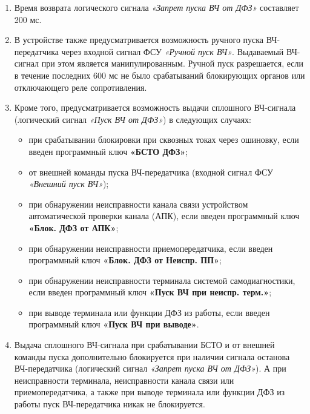 \begin{enumerate}[label=\arabic{section}.\arabic{subsection}.\arabic{enumi}, labelsep=4pt, leftmargin=0pt, itemindent=57pt, itemsep=0pt, parsep=5pt]
\begin{enumerate}[label=\arabic{section}.\arabic{subsection}.\arabic{enumi}.\arabic*, labelsep=4pt, leftmargin=0em, itemindent=65pt, parsep=0pt]
\item
Время возврата логического сигнала \textit{«Запрет пуска ВЧ от ДФЗ»} составляет 200 мс.

\item
В устройстве также предусматривается возможность ручного пуска ВЧ-передатчика через входной сигнал ФСУ \textit{«Ручной пуск ВЧ»}.
Выдаваемый ВЧ-сигнал при этом является манипулированным.
Ручной пуск разрешается, если в течение последних 600 мс не было срабатываний блокирующих органов или отключающего реле сопротивления.

\item
Кроме того, предусматривается возможность выдачи сплошного ВЧ-сигнала (логический сигнал \textit{«Пуск ВЧ от ДФЗ»}) в следующих случаях:
\begin{itemize} 
\item при срабатывании блокировки при сквозных токах через ошиновку, если введен программный ключ \textbf{«БСТО ДФЗ»};
\item от внешней команды пуска ВЧ-передатчика (входной сигнал ФСУ \textit{«Внешний пуск ВЧ»});
\item при обнаружении неисправности канала связи устройством автоматической проверки канала (АПК), если введен программный ключ \textbf{«Блок. ДФЗ от АПК»};
\item при обнаружении неисправности приемопередатчика, если введен программный ключ \textbf{«Блок. ДФЗ от Неиспр. ПП»};
\item при обнаружении неисправности терминала системой самодиагностики, если введен программный ключ \textbf{«Пуск ВЧ при неиспр. терм.»};
\item при выводе терминала или функции ДФЗ из работы, если введен программный ключ \textbf{«Пуск ВЧ при выводе»}.
\end{itemize}

\item
Выдача сплошного ВЧ-сигнала при срабатывании БСТО и от внешней команды пуска дополнительно блокируется при наличии сигнала останова ВЧ-передатчика (логический сигнал \textit{«Запрет пуска ВЧ от ДФЗ»}).
А при неисправности терминала, неисправности канала связи или приемопередатчика, а также при выводе терминала или функции ДФЗ из работы пуск ВЧ-передатчика никак не блокируется.


\end{enumerate}
\end{enumerate}
